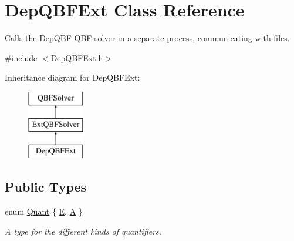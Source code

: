 \hypertarget{classDepQBFExt}{\section{Dep\-Q\-B\-F\-Ext Class Reference}
\label{classDepQBFExt}
}


Calls the Dep\-Q\-B\-F Q\-B\-F-\/solver in a separate process, communicating with files.  




{\ttfamily \#include $<$Dep\-Q\-B\-F\-Ext.\-h$>$}

Inheritance diagram for Dep\-Q\-B\-F\-Ext\-:\begin{figure}[H]
\begin{center}
\leavevmode
\includegraphics[height=3.000000cm]{classDepQBFExt}
\end{center}
\end{figure}
\subsection*{Public Types}
\begin{DoxyCompactItemize}
\item 
enum \hyperlink{classQBFSolver_ac091e263cb55286cc07b2451bcf4d3c7}{Quant} \{ \hyperlink{classQBFSolver_ac091e263cb55286cc07b2451bcf4d3c7a090ab4a5b262710ccd80e97d72f9a7b3}{E}, 
\hyperlink{classQBFSolver_ac091e263cb55286cc07b2451bcf4d3c7afd6518d5d985aa8346ac071e4c0d8ee0}{A}
 \}
\begin{DoxyCompactList}\small\item\em A type for the different kinds of quantifiers. \end{DoxyCompactList}\end{DoxyCompactItemize}
